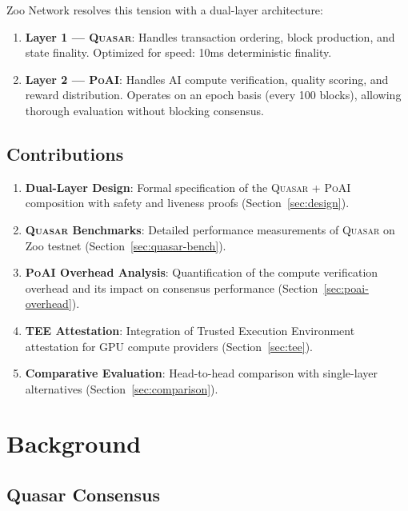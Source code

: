 \documentclass[11pt,letterpaper]{article}
\newcommand{\PoAI}{\textsc{PoAI}}
\newcommand{\Quasar}{\textsc{Quasar}}
\begin{document}
Zoo Network resolves this tension with a dual-layer architecture:

\begin{enumerate}
    \item \textbf{Layer 1 --- \Quasar{}}: Handles transaction ordering, block production, and state finality. Optimized for speed: 10ms deterministic finality.

    \item \textbf{Layer 2 --- \PoAI{}}: Handles AI compute verification, quality scoring, and reward distribution. Operates on an epoch basis (every 100 blocks), allowing thorough evaluation without blocking consensus.
\end{enumerate}

\subsection{Contributions}

\begin{enumerate}
    \item \textbf{Dual-Layer Design}: Formal specification of the \Quasar{} + \PoAI{} composition with safety and liveness proofs (Section~\ref{sec:design}).

    \item \textbf{\Quasar{} Benchmarks}: Detailed performance measurements of \Quasar{} on Zoo testnet (Section~\ref{sec:quasar-bench}).

    \item \textbf{\PoAI{} Overhead Analysis}: Quantification of the compute verification overhead and its impact on consensus performance (Section~\ref{sec:poai-overhead}).

    \item \textbf{TEE Attestation}: Integration of Trusted Execution Environment attestation for GPU compute providers (Section~\ref{sec:tee}).

    \item \textbf{Comparative Evaluation}: Head-to-head comparison with single-layer alternatives (Section~\ref{sec:comparison}).
\end{enumerate}

\section{Background}

\subsection{Quasar Consensus}
\end{document}
